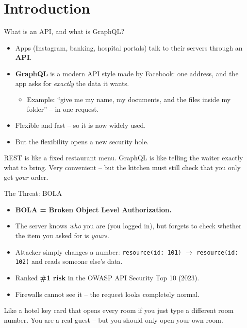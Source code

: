 \documentclass[aspectratio=169,11pt]{beamer}
\begin{document}
\section{Introduction}
\begin{frame}{What is an API, and what is GraphQL?}
\begin{itemize}
\item Apps (Instagram, banking, hospital portals) talk to their servers through an \textbf{API}.
\item \textbf{GraphQL} is a modern API style made by Facebook: one address, and the app asks for \emph{exactly} the data it wants.
\begin{itemize}
\item Example: “give me my name, my documents, and the files inside my folder” – in one request.
\end{itemize}
\item Flexible and fast – so it is now widely used.
\item But the flexibility opens a new security hole.
\end{itemize}
\vfill
\begin{simplebox}REST is like a fixed restaurant menu. GraphQL is like telling the waiter exactly what to bring. Very convenient – but the kitchen must still check that you only get \emph{your} order.\end{simplebox}
\end{frame}
\begin{frame}{The Threat: BOLA}
\begin{itemize}
\item \textbf{BOLA = Broken Object Level Authorization.}
\item The server knows \emph{who} you are (you logged in), but forgets to check whether the item you asked for is \emph{yours}.
\item Attacker simply changes a number: \texttt{resource(id: 101)} $\rightarrow$ \texttt{resource(id: 102)} and reads someone else’s data.
\item Ranked \textbf{\#1 risk} in the OWASP API Security Top 10 (2023).
\item Firewalls cannot see it – the request looks completely normal.
\end{itemize}
\vfill
\begin{simplebox}Like a hotel key card that opens every room if you just type a different room number. You are a real guest – but you should only open your own room.\end{simplebox}
\end{frame}
\end{document}
